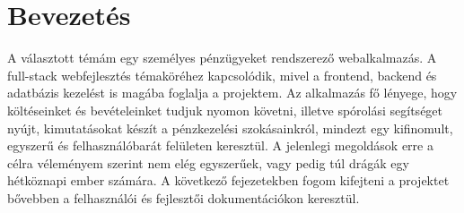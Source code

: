 \chapter{Bevezetés}
\label{ch:intro}

A választott témám egy személyes pénzügyeket rendszerező webalkalmazás. A full-stack webfejlesztés témaköréhez kapcsolódik, mivel a frontend, backend és adatbázis kezelést is magába foglalja a projektem.
Az alkalmazás fő lényege, hogy költéseinket és bevételeinket tudjuk nyomon követni, illetve spórolási segítséget nyújt, kimutatásokat készít a pénzkezelési szokásainkról, mindezt egy kifinomult, egyszerű és felhasználóbarát felületen keresztül. A jelenlegi megoldások erre a célra véleményem szerint nem elég egyszerűek, vagy pedig túl drágák egy hétköznapi ember számára. 
A következő fejezetekben fogom kifejteni a projektet bővebben a felhasználói és fejlesztői dokumentációkon keresztül.
